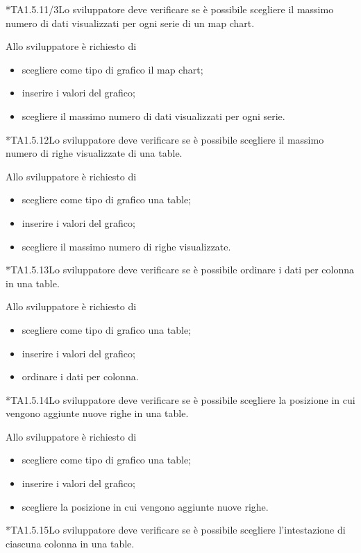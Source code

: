 	*{TA1.5.11/3}Lo sviluppatore deve verificare se è possibile scegliere il massimo numero di dati visualizzati per ogni serie di un map chart.

		Allo sviluppatore è richiesto di
		\begin{itemize}
			\item scegliere come tipo di grafico il map chart;
			\item inserire i valori del grafico;
			\item scegliere il massimo numero di dati visualizzati per ogni serie.
		\end{itemize}

	*{TA1.5.12}Lo sviluppatore deve verificare se è possibile scegliere il massimo numero di righe visualizzate di una table.

		Allo sviluppatore è richiesto di
		\begin{itemize}
			\item scegliere come tipo di grafico una table;
			\item inserire i valori del grafico;
			\item scegliere il massimo numero di righe visualizzate.
		\end{itemize}

	*{TA1.5.13}Lo sviluppatore deve verificare se è possibile ordinare i dati per colonna in una table.

		Allo sviluppatore è richiesto di
		\begin{itemize}
			\item scegliere come tipo di grafico una table;
			\item inserire i valori del grafico;
			\item ordinare i dati per colonna.
		\end{itemize}

	*{TA1.5.14}Lo sviluppatore deve verificare se è possibile scegliere la posizione in cui vengono aggiunte nuove righe in una table.

		Allo sviluppatore è richiesto di
		\begin{itemize}
			\item scegliere come tipo di grafico una table;
			\item inserire i valori del grafico;
			\item scegliere la posizione in cui vengono aggiunte nuove righe.
		\end{itemize}

	*{TA1.5.15}Lo sviluppatore deve verificare se è possibile scegliere l'intestazione di ciascuna colonna in una table.

